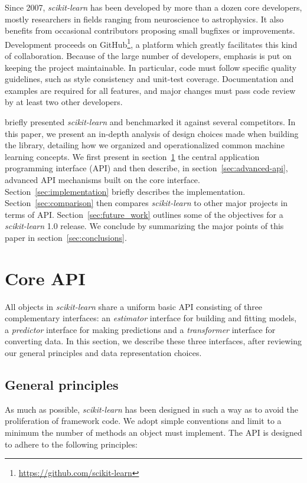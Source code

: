 \documentclass[twocolumn]{article}
\newcommand{\sklearn}{\textit{scikit-learn}\xspace}
\begin{document}
Since 2007, \sklearn has been developed by more than a dozen
core developers, mostly researchers in fields ranging from
neuroscience to astrophysics. It also benefits
from occasional contributors proposing small bugfixes or
improvements. Development proceeds on GitHub\footnote{\url{https://github.com/scikit-learn}},
a platform which greatly facilitates this kind of
collaboration. Because of the large number of developers, emphasis is
put on keeping the project maintainable. In particular, code must follow
specific quality guidelines, such as style consistency and unit-test coverage.
Documentation and examples are required for all features,
and major changes must pass code review by at least two other
developers.

\citet{pedregosa2011} briefly presented \sklearn and
benchmarked it against several competitors.
In this paper, we present an
in-depth analysis of design choices made when building the library,
detailing how we organized and operationalized
common machine learning concepts.
We first present in section~\ref{sec:core-api} the central application
programming interface (API) and then describe, in section~\ref{sec:advanced-api},
advanced API mechanisms built on the core interface.
Section~\ref{sec:implementation} briefly describes the implementation.
Section~\ref{sec:comparison} then
compares \sklearn to other major projects in terms of API\@.
Section~\ref{sec:future_work} outlines some of the objectives for
a \sklearn 1.0 release.
We conclude by summarizing the major points of this paper in
section~\ref{sec:conclusions}.

\section{Core API}

\label{sec:core-api}

All objects in \sklearn share a uniform basic API consisting of three
complementary interfaces: an \textit{estimator} interface for building and
fitting models, a \textit{predictor} interface for making predictions and a
\textit{transformer} interface for converting data. In this section, we describe
these three interfaces, after reviewing our general principles and data
representation choices.

\subsection{General principles}

As much as possible, \sklearn has been designed in such a way
as to avoid the proliferation of framework code.
We adopt simple conventions and limit to a minimum the number of methods
an object must implement.
The API is designed to adhere to the following principles:
\end{document}
